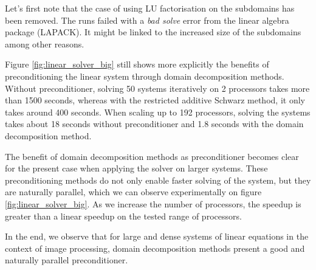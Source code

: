 \ifthesis
 Let's first note that the case of using LU factorisation on the subdomains has been removed.
 The runs failed with a \textit{bad solve} error from the linear algebra package (LAPACK).
 It might be linked to the increased size of the subdomains among other reasons.
\fi

Figure \ref{fig:linear_solver_big} still shows more explicitly the benefits of preconditioning the linear system through domain decomposition methods.
Without preconditioner, solving 50 systems iteratively on 2 processors takes more than 1500 seconds, whereas with the restricted additive Schwarz method, it only takes around 400 seconds.
When scaling up to 192 processors, solving the systems takes about 18 seconds without preconditioner and 1.8 seconds with the domain decomposition method.

\ifthesis
 The benefit of domain decomposition methods as preconditioner becomes clear for the present case when applying the solver on larger systems.
 These preconditioning methods do not only enable faster solving of the system, but they are naturally parallel, which we can observe experimentally on figure \ref{fig:linear_solver_big}.
 As we increase the number of processors, the speedup is greater than a linear speedup on the tested range of processors.
\fi

In the end, we observe that for large and dense systems of linear equations in the context of image processing, domain decomposition methods present a good and naturally parallel preconditioner.
